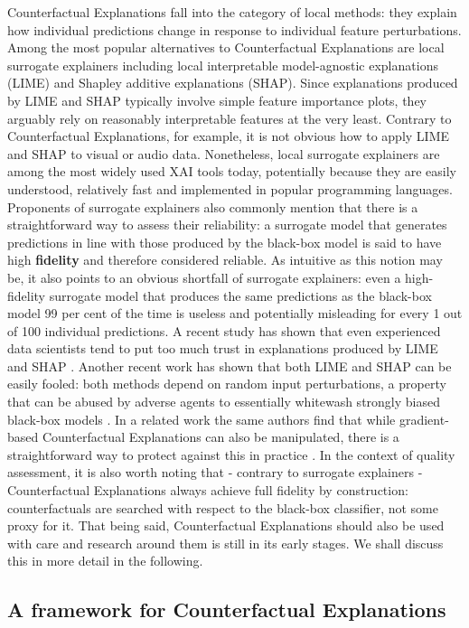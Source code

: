 \documentclass{juliacon}
\begin{document}
Counterfactual Explanations fall into the category of local methods:
they explain how individual predictions change in response to individual
feature perturbations. Among the most popular alternatives to
Counterfactual Explanations are local surrogate explainers including
local interpretable model-agnostic explanations (LIME) and Shapley
additive explanations (SHAP). Since explanations produced by LIME and
SHAP typically involve simple feature importance plots, they arguably
rely on reasonably interpretable features at the very least. Contrary to
Counterfactual Explanations, for example, it is not obvious how to apply
LIME and SHAP to visual or audio data. Nonetheless, local surrogate
explainers are among the most widely used XAI tools today, potentially
because they are easily understood, relatively fast and implemented in
popular programming languages. Proponents of surrogate explainers also
commonly mention that there is a straightforward way to assess their
reliability: a surrogate model that generates predictions in line with
those produced by the black-box model is said to have high
\textbf{fidelity} and therefore considered reliable. As intuitive as
this notion may be, it also points to an obvious shortfall of surrogate
explainers: even a high-fidelity surrogate model that produces the same
predictions as the black-box model 99 per cent of the time is useless
and potentially misleading for every 1 out of 100 individual
predictions. A recent study has shown that even experienced data
scientists tend to put too much trust in explanations produced by LIME
and SHAP \cite{kaur2020interpreting}. Another recent work has shown that
both LIME and SHAP can be easily fooled: both methods depend on random
input perturbations, a property that can be abused by adverse agents to
essentially whitewash strongly biased black-box models
\cite{slack2020fooling}. In a related work the same authors find that
while gradient-based Counterfactual Explanations can also be
manipulated, there is a straightforward way to protect against this in
practice \cite{slack2021counterfactual}. In the context of quality
assessment, it is also worth noting that - contrary to surrogate
explainers - Counterfactual Explanations always achieve full fidelity by
construction: counterfactuals are searched with respect to the black-box
classifier, not some proxy for it. That being said, Counterfactual
Explanations should also be used with care and research around them is
still in its early stages. We shall discuss this in more detail in the
following.

\hypertarget{sec-method}{%
\subsection{A framework for Counterfactual
Explanations}\label{sec-method}}
\end{document}
